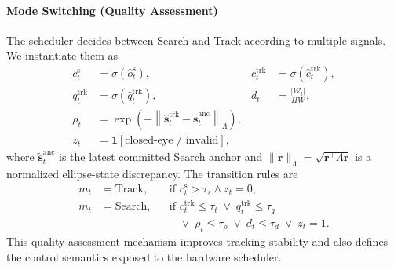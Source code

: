 \documentclass[journal]{IEEEtran}
\begin{document}
\paragraph*{Mode Switching (Quality Assessment)}
The scheduler decides between Search and Track according to multiple signals. We instantiate them as
\begin{align}
c_t^{\mathrm{s}} &= \sigma(\hat o_t^{\mathrm{s}}),&
c_t^{\mathrm{trk}} &= \sigma(\hat c_t^{\mathrm{trk}}),\\
q_t^{\mathrm{trk}} &= \sigma(\hat q_t^{\mathrm{trk}}),&
d_t &= \frac{|\mathcal W_t|}{HW},\\
\rho_t &= \exp\!\left(-\left\|\hat{\mathbf s}_t^{\mathrm{trk}}-\tilde{\mathbf s}_t^{\mathrm{anc}}\right\|_{\Lambda}\right),\\
z_t &= \mathbf{1}[\text{closed-eye / invalid}],
\end{align}
where $\tilde{\mathbf s}_t^{\mathrm{anc}}$ is the latest committed Search anchor and $\|\mathbf r\|_{\Lambda}=\sqrt{\mathbf r^{\top}\Lambda\mathbf r}$ is a normalized ellipse-state discrepancy. The transition rules are
\begin{align}
m_t &= \mathrm{Track}, && \text{if } c_t^{\mathrm{s}}>\tau_s \wedge z_t=0,\\
m_t &= \mathrm{Search}, && \text{if } c_t^{\mathrm{trk}}\le\tau_t
\;\vee\; q_t^{\mathrm{trk}}\le\tau_q \nonumber\\
&&& \phantom{\text{if }} \vee\; \rho_t\le\tau_{\rho}
\;\vee\; d_t\le\tau_d
\;\vee\; z_t=1.
\end{align}
This quality assessment mechanism improves tracking stability and also defines the control semantics exposed to the hardware scheduler.
\end{document}
